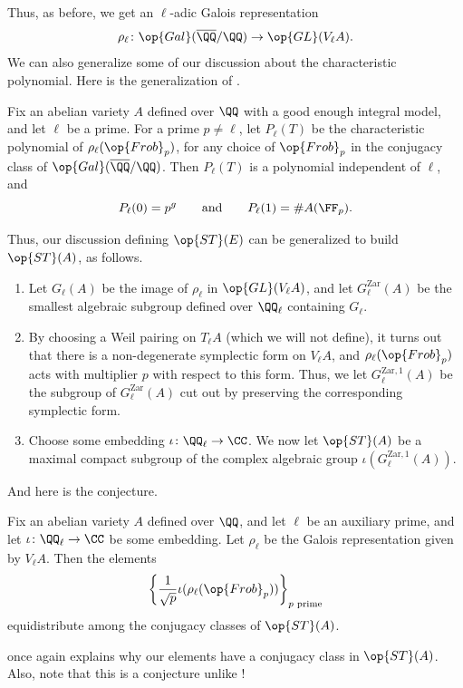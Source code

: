 \documentclass{article}
\begin{document}
Thus, as before, we get an $\ell$-adic Galois representation
\[\rho_\ell\colon\op{Gal}(\overline\QQ/\QQ)\to\op{GL}(V_\ell A).\]
We can also generalize some of our discussion about the characteristic polynomial. Here is the generalization of .
\begin{proposition}
	Fix an abelian variety $A$ defined over $\QQ$ with a good enough integral model, and let $\ell$ be a prime. For a prime $p\ne\ell$, let $P_\ell(T)$ be the characteristic polynomial of $\rho_\ell({\op{Frob}_p})$, for any choice of $\op{Frob}_p$ in the conjugacy class of $\op{Gal}(\overline\QQ/\QQ)$. Then $P_\ell(T)$ is a polynomial independent of $\ell$, and
	\[P_\ell(0)=p^g\qquad\text{and}\qquad P_\ell(1)=\#A(\FF_p).\]
\end{proposition}
Thus, our discussion defining $\op{ST}(E)$ can be generalized to build $\op{ST}(A)$, as follows.
\begin{enumerate}
	\item Let $G_\ell(A)$ be the image of $\rho_\ell$ in $\op{GL}(V_\ell A)$, and let $G_\ell^{\mathrm{Zar}}(A)$ be the smallest algebraic subgroup defined over $\QQ_\ell$ containing $G_\ell$.
	\item By choosing a Weil pairing on $T_\ell A$ (which we will not define), it turns out that there is a non-degenerate symplectic form on $V_\ell A$, and $\rho_\ell({\op{Frob}_p})$ acts with multiplier $p$ with respect to this form. Thus, we let $G_\ell^{\mathrm{Zar},1}(A)$ be the subgroup of $G_\ell^{\mathrm{Zar}}(A)$ cut out by preserving the corresponding symplectic form.
	\item Choose some embedding $\iota\colon\QQ_\ell\to\CC$. We now let $\op{ST}(A)$ be a maximal compact subgroup of the complex algebraic group $\iota\left(G_\ell^{\mathrm{Zar},1}(A)\right)$.
\end{enumerate}
And here is the conjecture.
\begin{conj} \label{conj:st}
	Fix an abelian variety $A$ defined over $\QQ$, and let $\ell$ be an auxiliary prime, and let $\iota\colon\QQ_\ell\to\CC$ be some embedding. Let $\rho_\ell$ be the Galois representation given by $V_\ell A$. Then the elements
	\[\left\{\frac1{\sqrt p}\iota(\rho_\ell({\op{Frob}_p}))\right\}_{p\text{ prime}}\]
	equidistribute among the conjugacy classes of $\op{ST}(A)$.
\end{conj}
 once again explains why our elements have a conjugacy class in $\op{ST}(A)$. Also, note that this is a conjecture unlike !
\end{document}
